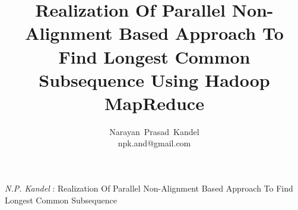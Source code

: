 \documentclass[journal,twoside]{IEEEtran}
\begin{document}
\setcounter{page}{18}
%
\title{Realization Of Parallel Non-Alignment Based Approach To Find Longest Common Subsequence Using Hadoop MapReduce}
%
%
%

\author{Narayan~Prasad~Kandel \\ npk.and@gmail.com}
% 
%


%
{\textit{ N.P. Kandel }: Realization Of Parallel Non-Alignment Based Approach To Find Longest Common Subsequence}
% 




\end{document}
